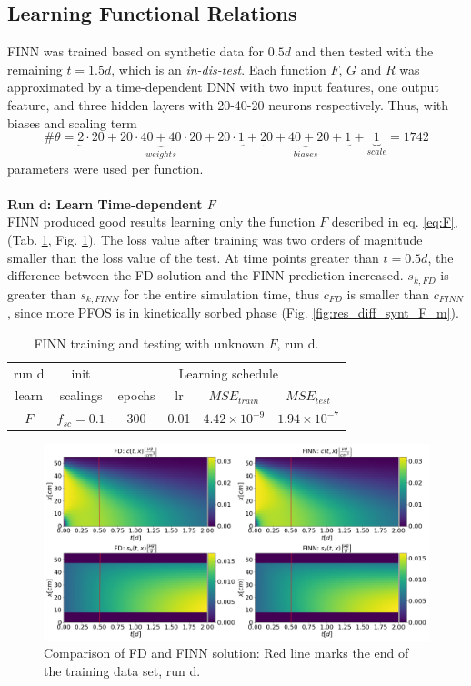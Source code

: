 \subsection{Learning Functional Relations}
FINN was trained based on synthetic data for $0.5d$ and then tested with the remaining $t = 1.5d$, which is an \textit{in-dis-test}. Each function $F$, $G$ and $R$ was approximated by a time-dependent DNN with two input features, one output feature, and three hidden layers with 20-40-20 neurons respectively. Thus, with biases and scaling term
\begin{equation}
   \#\theta = \underbrace{2 \cdot 20 + 20 \cdot 40 + 40 \cdot 20 + 20 \cdot 1}_{weights} + \underbrace{20 + 40 + 20 + 1}_{biases} + \underbrace{1}_{scale} = 1742
\end{equation}
parameters were used per function.
\\
\\
\textbf{Run d: Learn Time-dependent $F$}
\\
FINN produced good results learning only the function $F$ described in eq. \ref{eq:F}, (Tab. \ref{tab:learn_F}, Fig. \ref{fig:res_ov_synt_F_m}). The loss value after training was two orders of magnitude smaller than the loss value of the test. At time points greater than $t = 0.5d$, the difference between the FD solution and the FINN prediction increased. $s_{k,FD}$ is greater than $s_{k,FINN}$ for the entire simulation time, thus $c_{FD}$ is smaller than $c_{FINN}$, since more PFOS is in kinetically sorbed phase (Fig. \ref{fig:res_diff_synt_F_m}).
\begin{table}[h!]
    \centering
    \begin{tabular}{c|c|cccc}
    run d & init & \multicolumn{4}{c}{Learning schedule} \\
          learn & scalings & epochs & lr & $MSE_{train}$ & $MSE_{test}$\\[0.2 cm] \hline
         $F$ & $f_{sc} = 0.1$ & 300 & 0.01 & $4.42 \times 10^{-9}$ & $1.94 \times 10^{-7}$
        \end{tabular}
    \caption[FINN training and testing with unknown $F$, run d]{FINN training and testing with unknown $F$, run d.}
    \label{tab:learn_F}
\end{table}
\begin{figure}[h!]
	\centering
	\includegraphics[width=\textwidth]{images/res_ov_synt_F_m.png}
\caption[Comparison of FD and FINN solution, run d]{Comparison of FD and FINN solution: Red line marks the end of the training data set, run d.}
\label{fig:res_ov_synt_F_m}
\end{figure}
